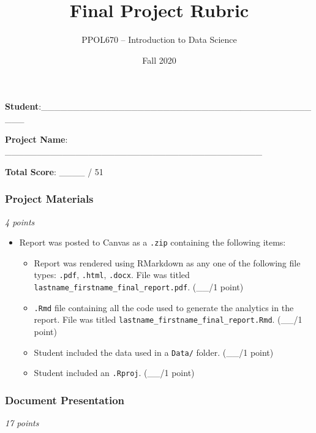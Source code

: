 \documentclass[
  11pt,
]{article}
\title{\textbf{Final Project Rubric}}
\author{\Large PPOL670 -- Introduction to Data Science}
\date{Fall 2020}
\providecommand{\tightlist}{%
  \setlength{\itemsep}{0pt}\setlength{\parskip}{0pt}}
\begin{document}
\maketitle

\textbf{Student}:\_\_\_\_\_\_\_\_\_\_\_\_\_\_\_\_\_\_\_\_\_\_\_\_\_\_\_\_\_\_\_\_\_\_\_\_\_\_\_\_\_\_\_\_\_

\textbf{Project Name}:
\_\_\_\_\_\_\_\_\_\_\_\_\_\_\_\_\_\_\_\_\_\_\_\_\_\_\_\_\_\_\_\_\_\_\_\_\_\_\_\_

\textbf{Total Score}: \_\_\_\_ / 51

\hypertarget{project-materials}{%
\subsubsection{Project Materials}\label{project-materials}}

\emph{4 points}

\begin{itemize}
\tightlist
\item
  Report was posted to Canvas as a \texttt{.zip} containing the
  following items:

  \begin{itemize}
  \tightlist
  \item
    Report was rendered using RMarkdown as any one of the following file
    types: \texttt{.pdf}, \texttt{.html}, \texttt{.docx}. File was
    titled \texttt{lastname\_firstname\_final\_report.pdf}. (\_\_/1
    point)
  \item
    \texttt{.Rmd} file containing all the code used to generate the
    analytics in the report. File was titled
    \texttt{lastname\_firstname\_final\_report.Rmd}. (\_\_/1 point)
  \item
    Student included the data used in a \texttt{Data/} folder. (\_\_/1
    point)
  \item
    Student included an \texttt{.Rproj}. (\_\_/1 point)
  \end{itemize}
\end{itemize}

\hypertarget{document-presentation}{%
\subsubsection{Document Presentation}\label{document-presentation}}

\emph{17 points}
\end{document}

